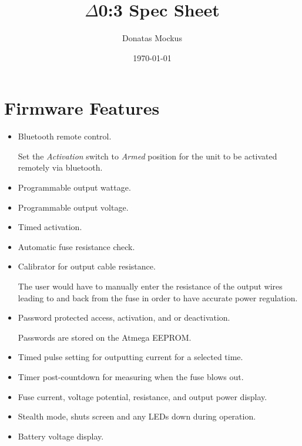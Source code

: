 \documentclass{article}
\title{\textbf{$\Delta$0:3 Spec Sheet}}
\author{Donatas Mockus}
\date{\today}
\begin{document}
\maketitle

\section{Firmware Features}
\begin{itemize}
	\item Bluetooth remote control.
	
	Set the \textit{Activation} switch to \textit{Armed} position for the unit to be activated remotely via bluetooth.
	\item Programmable output wattage.
	\item Programmable output voltage.
	\item Timed activation.
	\item Automatic fuse resistance check.
	\item Calibrator for output cable resistance.
	
	The user would have to manually enter the resistance of the output wires leading to and back from the fuse in order to have accurate power regulation.
	\item Password protected access, activation, and or deactivation.
	
	Passwords are stored on the Atmega EEPROM.
	\item Timed pulse setting for outputting current for a selected time.
	\item Timer post-countdown for measuring when the fuse blows out.
	\item Fuse current, voltage potential, resistance, and output power display.
	\item Stealth mode, shuts screen and any LEDs down during operation.
	\item Battery voltage display.



\end{itemize}
\end{document}
